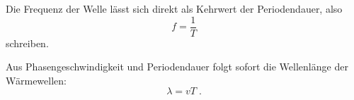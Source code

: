     Die Frequenz der Welle lässt sich direkt als Kehrwert der Periodendauer, also
    \begin{equation}
      \label{eqn:frequenz}
      f = \frac{1}{T}
    \end{equation}
    schreiben.

    Aus Phasengeschwindigkeit und Periodendauer folgt sofort die Wellenlänge der Wärmewellen:
    \begin{equation}
      \label{eqn:wellenlaenge}
      \lambda = v T \; .
    \end{equation}
